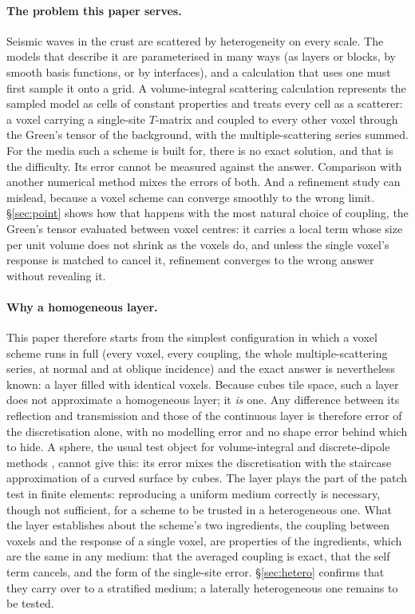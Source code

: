 \documentclass[extra,mreferee]{gji}
\begin{document}
\paragraph{The problem this paper serves.} Seismic waves in the crust are scattered by heterogeneity
on every scale. The models that describe it are parameterised in many ways (as layers or blocks,
by smooth basis functions, or by interfaces), and a calculation that uses one must first sample it
onto a grid. A volume-integral scattering calculation represents the sampled model as cells of
constant properties and treats every cell as a scatterer: a voxel carrying a single-site
$T$-matrix and coupled to every other voxel through the Green's tensor of the background, with the
multiple-scattering series summed. For the media such a scheme is built for, there is no exact
solution, and that is the difficulty. Its error cannot be measured against the answer. Comparison
with another numerical method mixes the errors of both. And a refinement study can mislead,
because a voxel scheme can converge smoothly to the wrong limit. \S\ref{sec:point} shows how that
happens with the most natural choice of coupling, the Green's tensor evaluated between voxel
centres: it carries a local term whose size per unit volume does not shrink as the voxels do, and
unless the single voxel's response is matched to cancel it, refinement converges to the wrong
answer without revealing it.

\paragraph{Why a homogeneous layer.} This paper therefore starts from the simplest configuration in
which a voxel scheme runs in full (every voxel, every coupling, the whole multiple-scattering series,
at normal and at oblique incidence) and the exact answer is nevertheless known: a layer filled with
identical voxels. Because cubes tile space, such a layer does not approximate a homogeneous layer; it
\emph{is} one. Any difference between its reflection and transmission and those of the continuous
layer is therefore error of the discretisation alone, with no modelling error and no shape error behind
which to hide. A sphere, the usual test object for volume-integral and discrete-dipole methods
\citep{Yurkin2006}, cannot give this: its error mixes the discretisation with the staircase
approximation of a curved surface by cubes. The layer plays the part of the patch test in finite
elements: reproducing a uniform medium correctly is necessary, though not sufficient, for a scheme to be
trusted in a heterogeneous one. What the layer establishes about the scheme's two ingredients, the
coupling between voxels and the response of a single voxel, are properties of the ingredients, which
are the same in any medium: that the averaged coupling is exact, that the self term cancels, and the
form of the single-site error. \S\ref{sec:hetero} confirms that they carry over to a stratified
medium; a laterally heterogeneous one remains to be tested.
\end{document}
